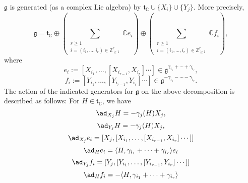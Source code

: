 \documentclass[reqno]{amsart} 
\begin{document}
\begin{corollary}\label{cor:g-gen-via-simple-stuff}
  $\mathfrak{g}$ is generated (as a complex Lie algebra) by $\mathfrak{t}_{\mathbb{C}} \cup \{X_i\} \cup \{Y_j\}$.  More precisely,
  \begin{equation}\label{eqn:decomposition-frak-g-via-simple-root-vecs}
    \mathfrak{g} =
    \mathfrak{t}_{\mathbb{C}}
    \oplus
    (
    \sum _{ \substack{
        r \geq 1 \\
        i = (i_1,\dotsc,i_r) \in \mathbb{Z}_{\geq 1}^r
      }
    }
    \mathbb{C} e_i
    )
    \oplus
    (
    \sum _{ \substack{
        r \geq 1 \\
        i = (i_1,\dotsc,i_r) \in \mathbb{Z}_{\geq 1}^r
      }
    }
    \mathbb{C} f_i
    ),
  \end{equation}
  where
  \begin{equation}\label{eqn:defn-e-i}
    e_i := [X_{i_1},\dotsc,[X_{i_{r-1}}, X_{i_r}]\dotsb]
    \in \mathfrak{g}^{\gamma_{i_1} + \dotsb + \gamma_{i_r}},
  \end{equation}
  \begin{equation}\label{eqn:defn-f-i}
    f_i := [Y_{i_1},\dotsc,[Y_{i_{r-1}}, Y_{i_r}]\dotsb]
    \in \mathfrak{g}^{-\gamma_{i_1} - \dotsb - \gamma_{i_r}}.
  \end{equation}
  The action of the indicated generators for $\mathfrak{g}$ on the above decomposition is described as follows: For $H \in \mathfrak{t}_{\mathbb{C}}$, we have
  \begin{equation}\label{eqn:}
    \ad_{X_j}
    H = -\gamma_j(H) X_j,
  \end{equation}
  \begin{equation}\label{eqn:}
    \ad_{Y_j}
    H = -\gamma_j(H) X_j,
  \end{equation}
  \begin{equation}\label{eqn:}
    \ad_{X_j}
    e_i
    =
    [X_j, [X_{i_1},\dotsc,[X_{i_{r-1}}, X_{i_r}]\dotsb]]
  \end{equation}
  \begin{equation}\label{eqn:}
    \ad_{H}
    e_i
    =
    \langle H, \gamma_{i_1} + \dotsb + \gamma_{i_r} \rangle
    e_i
  \end{equation}
  \begin{equation}\label{eqn:}
    \ad_{Y_j}
    f_i
    =
    [Y_j, [Y_{i_1},\dotsc,[Y_{i_{r-1}}, Y_{i_r}]\dotsb]]
  \end{equation}
  \begin{equation}\label{eqn:}
    \ad_{H}
    f_i
    =
    -\langle H, \gamma_{i_1} + \dotsb + \gamma_{i_r} \rangle

\end{equation}
\end{corollary}
\end{document}
